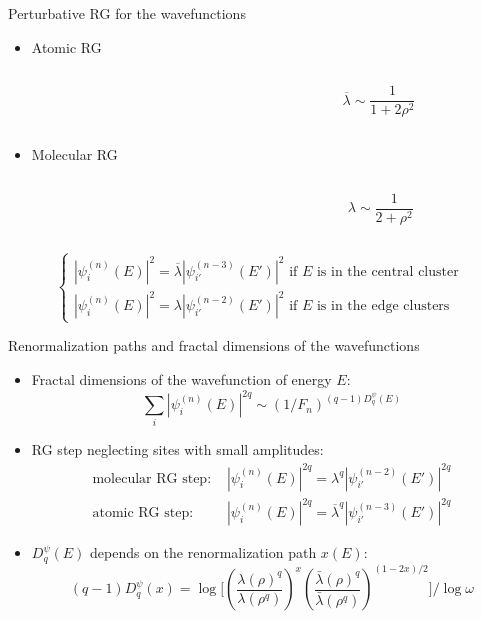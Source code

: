 \documentclass[xcolor=x11names,compress,professionalfonts]{beamer}
\renewcommand{\(}{\begin{columns}}
\renewcommand{\)}{\end{columns}}
\newcommand{\<}[1]{\begin{column}{#1}}
\renewcommand{\>}{\end{column}}
\newcommand{\lb}{\ensuremath{\overline{\lambda}}}
\begin{document}
\begin{frame}{Perturbative RG for the wavefunctions}
	\begin{itemize}

		\item Atomic RG
			\begin{columns}
			\begin{column}{9cm}
				
			\end{column}
			\begin{column}{2cm}
			\[ \lb \sim \frac{1}{1+2\rho^2}
			\]
			\end{column}
			\end{columns}
		\item Molecular RG
			\begin{columns}
			\begin{column}{9cm}
				
			\end{column}
			\begin{column}{2cm}
			\[ \lambda \sim \frac{1}{2+\rho^2}
			\]
			\end{column}
			\end{columns}
	\end{itemize}

\[
	\begin{cases}
		|\psi_i^{(n)}(E)|^2 = \lb |\psi_{i'}^{(n-3)}(E')|^2 \text{~if $E$ is in the central cluster}\\
		|\psi_i^{(n)}(E)|^2 = \lambda |\psi_{i'}^{(n-2)}(E')|^2 \text{~if }E\text{~is in the edge clusters}
	\end{cases}
	\]
\end{frame}

\begin{frame}{Renormalization paths and fractal dimensions of the wavefunctions}
\begin{itemize}
	\item Fractal dimensions of the wavefunction of energy $E$:
	\[ \sum_i |\psi_i^{(n)}(E)|^{2q} \sim (1/F_n)^{(q-1)D_q^\psi(E)}  \]
	\item RG step neglecting sites with small amplitudes:
		\begin{align*}
			\text{molecular RG step:~} &|\psi_i^{(n)}(E)|^{2q} = \lambda^q |\psi_{i'}^{(n-2)}(E')|^{2q} \\
			\text{atomic RG step:~} &|\psi_i^{(n)}(E)|^{2q} = \lb^q |\psi_{i'}^{(n-3)}(E')|^{2q}
		\end{align*}
	\item $D_q^\psi(E)$ depends on the renormalization path $x(E)$:
	\[ (q-1)D_q^\psi(x) = \log \Bigg[ \left( \frac{\lambda(\rho)^q}{\lambda(\rho^q)} \right)^x \left( \frac{\bar{\lambda}(\rho)^q}{\bar{\lambda}(\rho^q)} \right)^{(1-2x)/2} \Bigg]/\log \omega \]
\end{itemize}
\end{frame}
\end{document}
